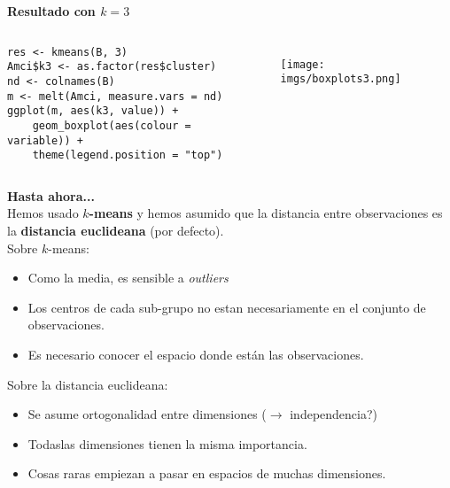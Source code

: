 \documentclass[10pt, aspectratio=169]{beamer}
\begin{document}
{
\begin{frame}[fragile]{}
\vspace{0.3cm}
\textcolor{UltraViolet}{\textbf{\large Resultado con $k=3$}} 
\begin{columns}
{\small
 \begin{verbatim}
res <- kmeans(B, 3)
Amci$k3 <- as.factor(res$cluster)
nd <- colnames(B)
m <- melt(Amci, measure.vars = nd)
ggplot(m, aes(k3, value)) + 
    geom_boxplot(aes(colour = variable)) + 
    theme(legend.position = "top")
\end{verbatim}}
 \pause
 \begin{figure}
 \texttt{[image: imgs/boxplots3.png]}
\end{figure}
\end{columns}
\end{frame}
}

\begin{frame}[fragile]{}
\vspace{0.3cm}
\textcolor{UltraViolet}{\textbf{\large Hasta ahora...}}\\
\vspace{0.3cm}
Hemos usado \textbf{$k$-means} y hemos asumido que la distancia entre observaciones es la \textbf{distancia euclideana} (por defecto).\\
\vspace{0.4cm}
\pause
\textcolor{PinkPeacock}{Sobre $k$-means}:
\begin{itemize}
 \item Como la media, es sensible a \textit{outliers}
 \item Los centros de cada sub-grupo no estan necesariamente en el conjunto de observaciones.
 \item Es necesario conocer el espacio donde están las observaciones. 
\end{itemize}
\vspace{0.4cm}
\pause
\textcolor{HawaianSurf}{Sobre la distancia euclideana}:
\begin{itemize}
 \item Se asume ortogonalidad entre dimensiones ($\longrightarrow$ independencia?)
 \item Todaslas dimensiones tienen la misma importancia.
 \item Cosas raras empiezan a pasar en espacios de muchas dimensiones.
\end{itemize}
\end{frame}
\end{document}
